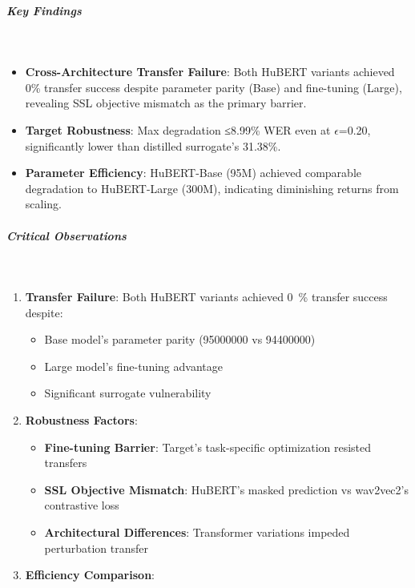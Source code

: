 \documentclass[../main.tex]{subfiles}
\begin{document}
\subparagraph{Key Findings}\leavevmode\\
\begin{itemize}
\item \textbf{Cross-Architecture Transfer Failure}: Both HuBERT variants achieved 0\% transfer success despite parameter parity (Base) and fine-tuning (Large), revealing SSL objective mismatch as the primary barrier.
\item \textbf{Target Robustness}: Max degradation ≤8.99\% WER even at $\epsilon$=0.20, significantly lower than distilled surrogate's 31.38\%.
\item \textbf{Parameter Efficiency}: HuBERT-Base (95M) achieved comparable degradation to HuBERT-Large (300M), indicating diminishing returns from scaling.
\end{itemize}


\subparagraph{Critical Observations}\leavevmode\\
\begin{enumerate}
\item \textbf{Transfer Failure}: Both HuBERT variants achieved \SI{0}{\percent} transfer success despite:
   \begin{itemize}
   \item Base model’s parameter parity (\num{95000000} vs \num{94400000})
   \item Large model’s fine-tuning advantage
   \item Significant surrogate vulnerability
   \end{itemize}
\item \textbf{Robustness Factors}:
   \begin{itemize}
   \item \textbf{Fine-tuning Barrier}: Target’s task-specific optimization resisted transfers
   \item \textbf{SSL Objective Mismatch}: HuBERT’s masked prediction vs wav2vec2’s contrastive loss
   \item \textbf{Architectural Differences}: Transformer variations impeded perturbation transfer
   \end{itemize}
\item \textbf{Efficiency Comparison}:
   \begin{table}[h]
   \centering
   \small
   \caption{Comparison of HuBERT Surrogate Models}
   \label{tab:hubert_comparison}
   \end{table}
\end{enumerate}
\end{document}
